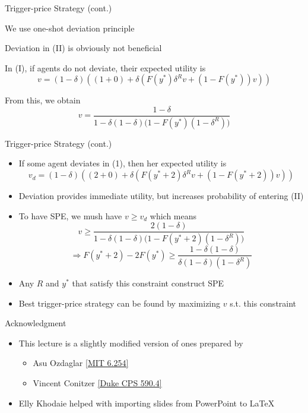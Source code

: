 \documentclass[11pt,aspectratio=169,handout]{beamer}
\begin{document}
  \begin{frame} {Trigger-price Strategy (cont.)}
   \begin{itemizes}
    \item We use one-shot deviation principle
    \item Deviation in (II) is obviously not beneficial
    \item In (I), if agents do not deviate, their \alert{expected utility} is
    $$
    v = (1-\delta)\left((1+0)+\delta\left(F(y^*)\delta^{R} v + (1-F(y^*)) v \right)\right)
    $$
    \item From this, we obtain
    $$
    v = \frac{1-\delta}{1-\delta(1-\delta)\big(1-F(y^*)(1-\delta^{R})\big)}
    $$    
   \end{itemizes}
  \end{frame}

  \begin{frame}{Trigger-price Strategy (cont.)}
   
   \begin{itemize}
    \item If some agent deviates in (1), then her expected utility is
    $$
    v_d = (1-\delta)\left((2+0)+\delta\left(F(y^*+2)\delta^{R} v + (1-F(y^*+2)) v \right)\right)
    $$
    \item Deviation provides immediate utility, but increases probability of entering (II)
    \item To have SPE, we mush have $v \geq v_d$ which means
    $$
    v \ge \frac{2(1-\delta)}{1-\delta(1-\delta)\big(1-F(y^*+2)(1-\delta^{R})\big)}
    $$
    $$
    \Rightarrow F(y^*+2)-2F(y^*) \ge \frac{1-\delta(1-\delta)}{\delta(1-\delta)(1-\delta^{R})}
    $$
    \item  Any $R$ and $y^{*}$ that satisfy this constraint construct SPE
    \item \alert{Best trigger-price strategy} can be found by maximizing $v$ s.t. this constraint
   \end{itemize}
 
  \end{frame}  
  
  
  \begin{frame}{Acknowledgment}
   \begin{itemize}
   \setlength{\itemsep}{1em}
    \item This lecture is a slightly modified version of ones prepared by
    \begin{itemize}
     \item Asu Ozdaglar \href{https://ocw.mit.edu/courses/electrical-engineering-and-computer-science/6-254-game-theory-with-engineering-applications-spring-2010/index.htm}{[MIT 6.254]}
     \item Vincent Conitzer \href{https://courses.cs.duke.edu/spring16/compsci590.4/}{[Duke CPS 590.4]}
    \end{itemize}
    \item Elly Khodaie helped with importing slides from PowerPoint to \LaTeX
   \end{itemize}
  \end{frame}
\end{document}
